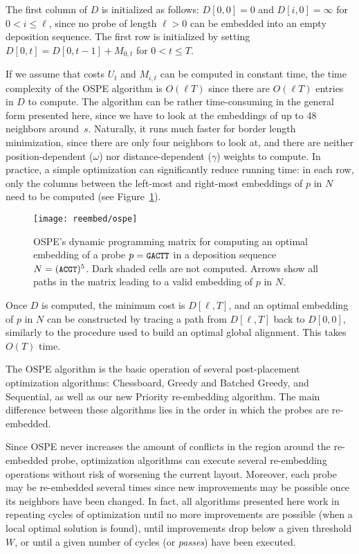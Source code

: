 The first column of $D$ is initialized as follows: $D[0,0] = 0$ and
$D[i,0] = \infty$ for $0 < i \leq \ell$, since no probe of length $\ell > 0$ can
be embedded into an empty deposition sequence. The first row is initialized by
setting $D[0,t] = D[0,t-1]+M_{0,t}$ for $0<t\leq T$.

If we assume that costs $U_t$ and $M_{i,t}$ can be computed in constant time,
the time complexity of the OSPE algorithm is $O(\ell T)$ since there are
$O(\ell T)$ entries in $D$ to compute. The algorithm can be rather
time-consuming in the general form presented here, since we have to look at the
embeddings of up to 48 neighbors around~$s$. Naturally, it runs much faster for
border length minimization, since there are only four neighbors to look at, and
there are neither position-dependent ($\omega$) nor distance-dependent
($\gamma$) weights to compute. In practice, a simple optimization can
significantly reduce running time: in each row, only the columns between the
left-most and right-most embeddings of $p$ in $N$ need to be computed (see
Figure~\ref{fig:ospe}).

\begin{figure}[t]\centering
\texttt{[image: reembed/ospe]}
\caption{\label{fig:ospe}%
  OSPE's dynamic programming matrix for computing an optimal embedding of a
  probe $p={\text{\small{\tt{GACTT}}}}$ in a deposition sequence $N=({\text{\small{\tt{ACGT}}}})^5$. Dark
  shaded cells are not computed. Arrows show all paths in the matrix leading to
  a valid embedding of $p$ in $N$.}
\end{figure}

Once $D$ is computed, the minimum cost is $D[\ell,T]$, and an optimal embedding
of $p$ in $N$ can be constructed by tracing a path from $D[\ell,T]$ back to
$D[0,0]$, similarly to the procedure used to build an optimal global alignment.
This takes $O(T)$ time.

The OSPE algorithm is the basic operation of several post-placement optimization
algorithms: Chessboard, Greedy and Batched Greedy, and Sequential, as well as
our new Priority re-embedding algorithm. The main difference between these
algorithms lies in the order in which the probes are re-embedded.

Since OSPE never increases the amount of conflicts in the region around the
re-embedded probe, optimization algorithms can execute several re-embedding
operations without risk of worsening the current layout. Moreover, each probe
may be re-embedded several times since new improvements may be possible once its
neighbors have been changed. In fact, all algorithms presented here work in
repeating cycles of optimization until no more improvements are possible (when a
local optimal solution is found), until improvements drop below a given
threshold $W$, or until a given number of cycles (or \emph{passes}) have been
executed.

